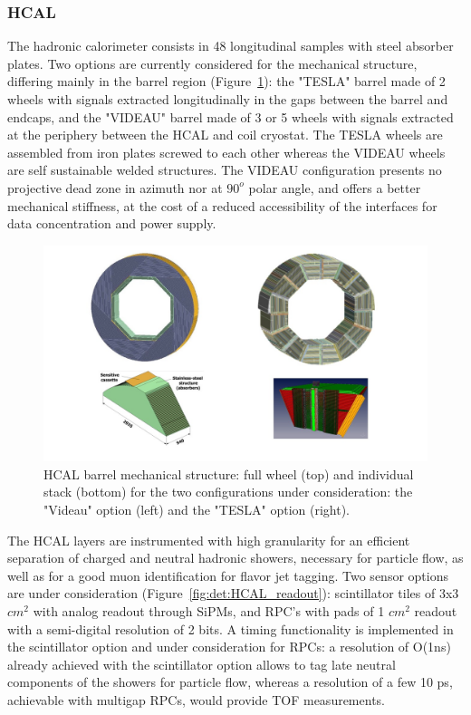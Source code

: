 \vspace{1cm}
\subsubsection*{\bf HCAL}

The hadronic calorimeter consists in 48 longitudinal samples with steel absorber plates. Two options are currently considered for the mechanical structure, differing mainly in the barrel region (Figure~\ref{fig:det:HCAL}): the "TESLA" barrel made of 2 wheels with signals extracted longitudinally in the gaps between the barrel and endcaps, and the "VIDEAU" barrel made of 3 or 5 wheels with signals extracted at the periphery between the HCAL and coil cryostat. The TESLA wheels are assembled from iron plates screwed to each other whereas the VIDEAU wheels are self sustainable welded structures. The VIDEAU configuration presents no projective dead zone in azimuth nor at $90^o$ polar angle, and offers a better mechanical stiffness, at the cost of a reduced accessibility of the interfaces for data concentration and power supply.

\begin{figure}[t!]
\centering
\includegraphics[width=1.1\hsize]{Detector/fig/HCAL_structure.jpg}
\caption{HCAL barrel mechanical structure: full wheel (top) and individual stack (bottom) for the two configurations under consideration: the "Videau" option (left) and the "TESLA" option (right).}
\label{fig:det:HCAL}
\end{figure}

The HCAL layers are instrumented with high granularity for an efficient separation of charged and neutral hadronic showers, necessary for particle flow, as well as for a good muon identification for flavor jet tagging. Two sensor options are under consideration (Figure~\ref{fig:det:HCAL_readout}): scintillator tiles of 3x3 $cm^2$ with analog readout through SiPMs, and RPC's with pads of 1 $cm^2$ readout with a semi-digital resolution of 2 bits. A timing functionality is implemented in the scintillator option and under consideration for RPCs: a resolution of O(1ns) already achieved with the scintillator option allows to tag late neutral components of the showers for particle flow, whereas a resolution of a few 10 ps, achievable with multigap RPCs, would provide TOF measurements. 

